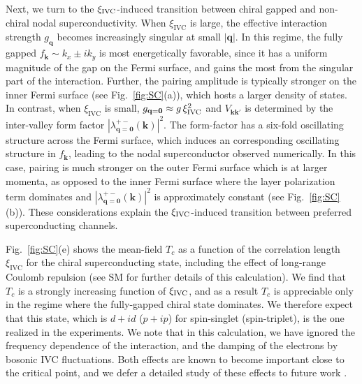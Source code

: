 \documentclass[aps,pra,twocolumn,superscriptaddress,10pt,article,nofootinbib,showpacs,longbibliography]{revtex4-1}
\def \k{{\mathbf k}}
\def \q{{\mathbf q}}
\begin{document}
Next, we turn to the $\xi_{\rm IVC}$-induced transition between chiral gapped and non-chiral nodal superconductivity.
When $\xi_{\textrm{IVC}}$ is large, the effective interaction strength $g_{\q}$ becomes increasingly singular at small $|\q|$. 
In this regime, the fully gapped $f_\k \sim k_x \pm i k_y$ is most energetically favorable, since it has a uniform magnitude of the gap on the Fermi surface, and gains the most from the singular part of the interaction. 
Further, the pairing amplitude is typically stronger on the inner Fermi surface (see Fig.~\ref{fig:SC}(a)), which hosts a larger density of states.
In contrast, when  $\xi_{\textrm{IVC}}$ is small, $g_{\q = \bm{0}} \approx g \, \xi_{\rm IVC}^2$ and $V_{\k \k'}$ is determined by the inter-valley form factor $|\lambda^{+-}_{\q=\bm{0}}(\k)|^2$. 
The form-factor has a six-fold oscillating structure across the Fermi surface, which induces an corresponding oscillating structure in $f_\k$, leading to the nodal superconductor observed numerically. 
In this case, pairing is much stronger on the outer Fermi surface which is at larger momenta, as opposed to the inner Fermi surface where the layer polarization term dominates and $|\lambda^{+-}_{\q = \bm{0}}(\k)|^2$ is approximately constant (see Fig.~\ref{fig:SC}(b)).
These considerations explain the $\xi_{\rm IVC}$-induced transition between preferred superconducting channels. 

Fig.~\ref{fig:SC}(e) shows the mean-field $T_c$ as a function of the correlation length $\xi_{\textrm{IVC}}$ for the chiral superconducting state, including the effect of long-range Coulomb repulsion (see SM \cite{SM} for further details of this calculation). We find that $T_c$ is a strongly increasing function of $\xi_{\rm{IVC}}$, and as a result $T_c$ is appreciable only in the regime where the fully-gapped chiral state dominates.
We therefore expect that this state, which is $d + id$ ($p + ip$) for spin-singlet (spin-triplet), is the one realized in the experiments. 
We note that in this calculation, we have ignored the frequency dependence of the interaction, and the damping of the electrons by bosonic IVC fluctuations.
Both effects are known to become important close to the critical point, and we defer a detailed study of these effects to future work \cite{abanov2001coherent}.
\end{document}
